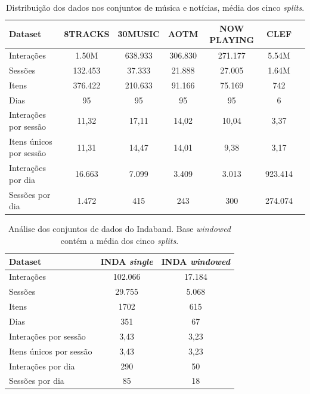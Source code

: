   \begin{table}
    \centering
    \begin{tabular}{lcccccc}
        \toprule
        \textbf{Dataset} & \textbf{8TRACKS} & \textbf{30MUSIC} & \textbf{AOTM} & \textbf{NOW PLAYING} & \textbf{CLEF} \\
        \midrule
        Interações & 1.50M & 638.933 & 306.830 & 271.177 & 5.54M \\
        Sessões & 132.453 & 37.333 & 21.888 & 27.005 & 1.64M \\
        Itens & 376.422 & 210.633 & 91.166 & 75.169 & 742 \\
        Dias & 95 & 95 & 95 & 95 & 6 \\
        \hline
        Interações por sessão & 11,32 & 17,11 & 14,02 & 10,04 & 3,37 \\
        Itens únicos por sessão & 11,31 & 14,47 & 14,01 & 9,38 & 3,17 \\
        Interações por dia & 16.663 & 7.099 & 3.409 & 3.013 & 923.414 \\
        Sessões por dia & 1.472 & 415 & 243 & 300 & 274.074 \\
        \bottomrule
    \end{tabular}
    \caption{Distribuição dos dados nos conjuntos de música e notícias, média dos cinco \textit{splits}.}
    \label{tab:datasets_comparison}
  \end{table}
  
  \begin{table}
    \centering
    \begin{tabular}{lcc}
        \toprule
        \textbf{Dataset} & \textbf{INDA \textit{single}} & \textbf{INDA \textit{windowed}}\\
        \midrule
        Interações & 102.066 & 17.184  \\
        Sessões & 29.755 & 5.068  \\
        Itens & 1702 & 615  \\
        Dias & 351 & 67  \\
        \hline
        Interações por sessão & 3,43 & 3,23 \\
        Itens únicos por sessão & 3,43 & 3,23 \\
        Interações por dia & 290 & 50 \\
        Sessões por dia & 85 & 18 \\
        \bottomrule
    \end{tabular}
    \caption{Análise dos conjuntos de dados do Indaband. Base \textit{windowed} contém a média dos cinco \textit{splits}.}
    \label{tab:datasets_including_inda}
  \end{table}
  
